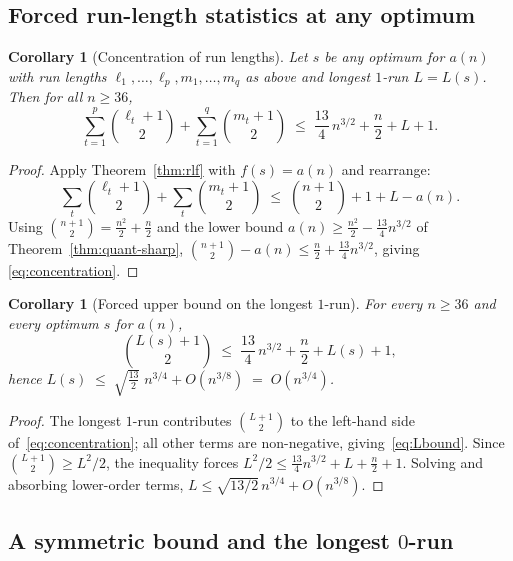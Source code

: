 ﻿\documentclass[11pt,a4paper]{article}
\theoremstyle{plain}
\newtheorem{corollary}[theorem]{Corollary}
\theoremstyle{definition}
\theoremstyle{remark}
\begin{document}
\subsection{Forced run-length statistics at any optimum}

\begin{corollary}[Concentration of run lengths]\label{cor:concentration}
Let $s$ be any optimum for $a(n)$ with run lengths
$\ell_1,\ldots,\ell_p,m_1,\ldots,m_q$ as above and longest
$1$-run $L=L(s)$.  Then for all $n\ge 36$,
\begin{equation}\label{eq:concentration}
  \sum_{t=1}^{p}\binom{\ell_t+1}{2}
  +\sum_{t=1}^{q}\binom{m_t+1}{2}
  \;\le\;\frac{13}{4}\,n^{3/2}+\frac{n}{2}+L+1.
\end{equation}
\end{corollary}

\begin{proof}
Apply Theorem~\ref{thm:rlf} with $f(s)=a(n)$ and rearrange:
\[
  \sum_t\binom{\ell_t+1}{2}+\sum_t\binom{m_t+1}{2}
  \;\le\;\binom{n+1}{2}+1+L-a(n).
\]
Using $\binom{n+1}{2}=\tfrac{n^2}{2}+\tfrac{n}{2}$ and the lower
bound $a(n)\ge\tfrac{n^2}{2}-\tfrac{13}{4}n^{3/2}$ of
Theorem~\ref{thm:quant-sharp},
$\binom{n+1}{2}-a(n)\le\tfrac{n}{2}+\tfrac{13}{4}n^{3/2}$, giving
\eqref{eq:concentration}.
\end{proof}

\begin{corollary}[Forced upper bound on the longest $1$-run]\label{cor:Lbound}
For every $n\ge 36$ and every optimum $s$ for $a(n)$,
\begin{equation}\label{eq:Lbound}
  \binom{L(s)+1}{2}
  \;\le\;\frac{13}{4}\,n^{3/2}+\frac{n}{2}+L(s)+1,
\end{equation}
hence
$L(s)\;\le\;\sqrt{\tfrac{13}{2}}\;n^{3/4}+O(n^{3/8})\;=\;O(n^{3/4})$.
\end{corollary}

\begin{proof}
The longest $1$-run contributes $\binom{L+1}{2}$ to the left-hand
side of~\eqref{eq:concentration}; all other terms are non-negative,
giving~\eqref{eq:Lbound}.  Since $\binom{L+1}{2}\ge L^2/2$, the
inequality forces $L^2/2\le\tfrac{13}{4}n^{3/2}+L+\tfrac{n}{2}+1$.
Solving and absorbing lower-order terms,
$L\le\sqrt{13/2}\,n^{3/4}+O(n^{3/8})$.
\end{proof}

\subsection{A symmetric bound and the longest $0$-run}
\end{document}
